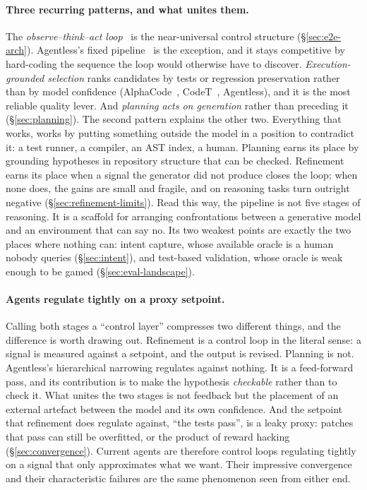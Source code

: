 \documentclass[
  english,        %
  font=times,     %
  twocolumn,      %
]{tumarticle}
\begin{document}
\paragraph{Three recurring patterns, and what unites them.}
The \emph{observe--think--act loop}~\cite{yao2023react} is the near-universal
control structure (\S\ref{sec:e2e-arch}). Agentless's fixed
pipeline~\cite{xia2024agentless} is the exception, and it stays competitive by
hard-coding the sequence the loop would otherwise have to discover.
\emph{Execution-grounded selection} ranks candidates by tests or regression
preservation rather than by model confidence (AlphaCode~\cite{li2022alphacode},
CodeT~\cite{chen2022codet}, Agentless), and it is the most reliable quality lever.
And \emph{planning acts on generation} rather than preceding it
(\S\ref{sec:planning}). The second pattern explains the other two. Everything that
works, works by putting something outside the model in a position to contradict
it: a test runner, a compiler, an AST index, a human. Planning earns its place by
grounding hypotheses in repository structure that can be checked. Refinement earns
its place when a signal the generator did not produce closes the loop; when none
does, the gains are small and fragile, and on reasoning tasks turn outright
negative (\S\ref{sec:refinement-limits}). Read this way, the pipeline is
not five stages of reasoning. It is a scaffold for arranging confrontations
between a generative model and an environment that can say no. Its two weakest
points are exactly the two places where nothing can: intent capture, whose
available oracle is a human nobody queries (\S\ref{sec:intent}), and test-based
validation, whose oracle is weak enough to be gamed (\S\ref{sec:eval-landscape}).

\paragraph{Agents regulate tightly on a proxy setpoint.}
Calling both stages a ``control layer'' compresses two different things, and the
difference is worth drawing out. Refinement is a control loop in the literal
sense: a signal is measured against a setpoint, and the output is revised.
Planning is not. Agentless's hierarchical narrowing regulates against nothing. It
is a feed-forward pass, and its contribution is to make the hypothesis
\emph{checkable} rather than to check it. What unites the two stages is not
feedback but the placement of an external artefact between the model and its own
confidence. And the setpoint that refinement does regulate against, ``the tests
pass'', is a leaky proxy: patches that pass can still be overfitted, or the product
of reward hacking (\S\ref{sec:convergence}). Current agents are therefore control
loops regulating tightly on a signal that only approximates what we want. Their
impressive convergence and their characteristic failures are the same phenomenon
seen from either end.
\end{document}
